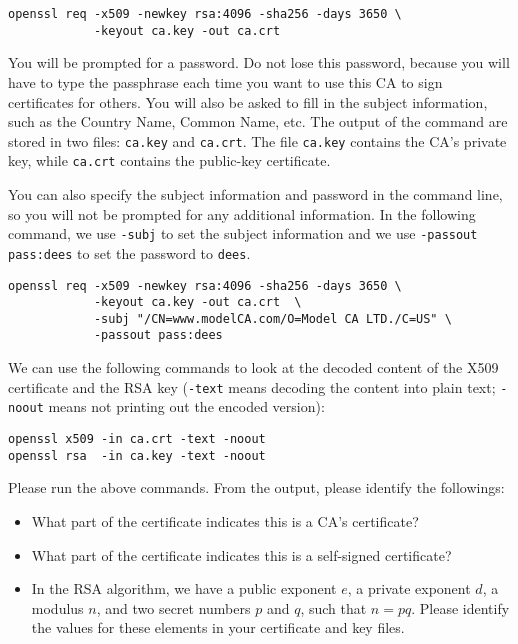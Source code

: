 \begin{lstlisting}
openssl req -x509 -newkey rsa:4096 -sha256 -days 3650 \
            -keyout ca.key -out ca.crt  
\end{lstlisting}

You will be prompted for a password. Do not lose this password,
because you will have to type the passphrase 
each time you want to use this CA to sign certificates for others.
You will also be asked to fill in the subject information,
such as the Country Name, Common Name, etc. 
The output of the command are stored in two files: {\tt ca.key} and 
{\tt ca.crt}. The file {\tt ca.key} contains the 
CA's private key, while {\tt ca.crt} contains the public-key certificate.


You can also specify the subject information and password in the command
line, so you will not be prompted for any additional information. In the 
following command, we use \texttt{-subj} to set the subject information
and we use \texttt{-passout pass:dees} to set the password to \texttt{dees}.  

\begin{lstlisting}
openssl req -x509 -newkey rsa:4096 -sha256 -days 3650 \
            -keyout ca.key -out ca.crt  \
            -subj "/CN=www.modelCA.com/O=Model CA LTD./C=US" \
            -passout pass:dees  
\end{lstlisting}


We can use the following commands 
to look at the decoded content of the X509 certificate
and the RSA key (\texttt{-text} means decoding the content
into plain text; \texttt{-noout} means not printing 
out the encoded version): 

\begin{lstlisting}
openssl x509 -in ca.crt -text -noout
openssl rsa  -in ca.key -text -noout 
\end{lstlisting}


Please run the above commands. From the output, please identify
the followings: 

\begin{itemize}[noitemsep]
\item What part of the certificate indicates this is a CA's certificate?
\item What part of the certificate indicates this is a self-signed certificate?
\item In the RSA algorithm, we have a public exponent $e$, a private 
exponent $d$, a modulus $n$, and two secret numbers $p$ and $q$, such 
that $n = pq$. Please identify the values for these elements in 
your certificate and key files. 
\end{itemize}



